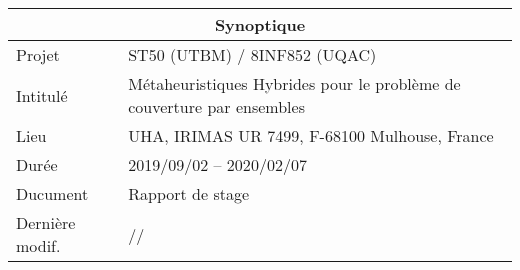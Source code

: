
\begin{tabularx}{0.9\textwidth}{|l|X|}
	\hline
	\multicolumn{2}{|c|}{\cellcolor{gray!30}Synoptique}\\
	\hline
	Projet & \acrshort{ST50} (\acrshort{UTBM}) / \acrshort{8INF852} (\acrshort{UQAC})\\
	Intitulé & Métaheuristiques Hybrides pour le problème de couverture par ensembles\\
	Lieu & \acrshort{UHA}, \acrshort{IRIMAS} UR 7499, F-68100 Mulhouse, France\\
	Durée & 2019/09/02 -- 2020/02/07\\
	\hline
	Ducument & Rapport de stage\\
	Dernière modif. & \the\year/\twodigits\month/\twodigits\day\\
	\hline
\end{tabularx}
